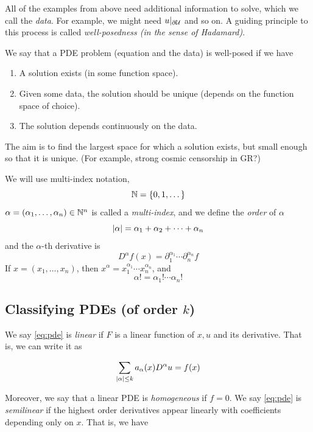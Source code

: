 \documentclass{article}
\begin{document}
All of the examples from above need additional information to solve, which we call the \emph{data}. For example, we might need \(u\vert_{\partial \mathcal{U}}\) and so on. A guiding principle to this process is called \emph{well-posedness (in the sense of Hadamard)}.

We say that a PDE problem (equation and the data) is well-posed if we have

\begin{enumerate}
    \item A solution exists (in some function space).
    \item Given some data, the solution should be unique (depends on the function space of choice).
    \item The solution depends continuously on the data.
\end{enumerate}

The aim is to find the largest space for which a solution exists, but small enough so that it is unique. (For example, strong cosmic censorship in GR?)

\begin{notation}
     We will use multi-index notation,
    \[\mathbb{N} = \{0, 1, \dots\}\]
    \(\alpha = (\alpha_1, \dots, \alpha_n) \in \mathbb{N}^n\) is called a \emph{multi-index}, and we define the \emph{order} of \(\alpha\)
    \[\abs{\alpha} = \alpha_1 + \alpha_2 + \dots + \alpha_n\]
    and the \(\alpha\)-th derivative is
    \[D^\alpha f(x) = \partial_1^{\alpha_1}\cdots\partial_n^{\alpha_n}f\]
    If \(x = (x_1, \dots, x_n)\), then \(x^\alpha = x_1^{\alpha_1}\cdots x_n^{\alpha_n}\), and
    \[\alpha! = \alpha_1!\cdots \alpha_n!\]
\end{notation}

\subsection{Classifying PDEs (of order \(k\))}

We say \cref{eq:pde} is \emph{linear} if \(F\) is a linear function of \(x, u\) and its derivative. That is, we can write it as

\[\sum_{\abs{\alpha} \le k}a_\alpha(x) D^\alpha u = f(x)\]

Moreover, we say that a linear PDE is \emph{homogeneous} if \(f = 0\). We say \cref{eq:pde} is \emph{semilinear} if the highest order derivatives appear linearly with coefficients depending only on \(x\). That is, we have
\end{document}
